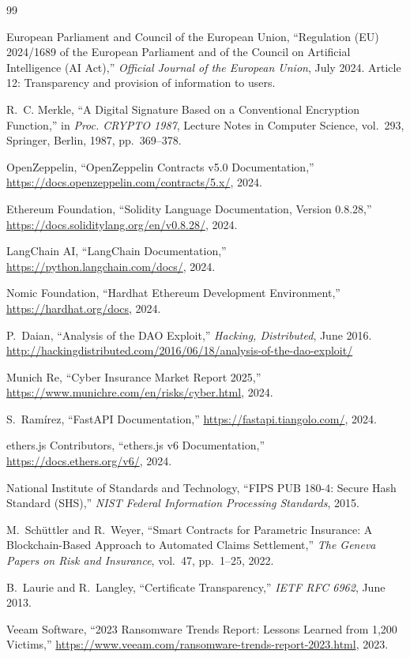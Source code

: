 \documentclass[12pt,a4paper]{article}
\begin{document}
\begin{thebibliography}{99}

European Parliament and Council of the European Union,
``Regulation (EU) 2024/1689 of the European Parliament and of the
Council on Artificial Intelligence (AI Act),''
\emph{Official Journal of the European Union}, July 2024.
Article 12: Transparency and provision of information to users.

R.~C. Merkle,
``A Digital Signature Based on a Conventional Encryption Function,''
in \emph{Proc. CRYPTO 1987}, Lecture Notes in Computer Science,
vol.~293, Springer, Berlin, 1987, pp.~369--378.

OpenZeppelin,
``OpenZeppelin Contracts v5.0 Documentation,''
\url{https://docs.openzeppelin.com/contracts/5.x/}, 2024.

Ethereum Foundation,
``Solidity Language Documentation, Version 0.8.28,''
\url{https://docs.soliditylang.org/en/v0.8.28/}, 2024.

LangChain AI,
``LangChain Documentation,''
\url{https://python.langchain.com/docs/}, 2024.

Nomic Foundation,
``Hardhat Ethereum Development Environment,''
\url{https://hardhat.org/docs}, 2024.

P.~Daian,
``Analysis of the DAO Exploit,''
\emph{Hacking, Distributed}, June 2016.
\url{http://hackingdistributed.com/2016/06/18/analysis-of-the-dao-exploit/}

Munich Re,
``Cyber Insurance Market Report 2025,''
\url{https://www.munichre.com/en/risks/cyber.html}, 2024.

S.~Ram\'irez,
``FastAPI Documentation,''
\url{https://fastapi.tiangolo.com/}, 2024.

ethers.js Contributors,
``ethers.js v6 Documentation,''
\url{https://docs.ethers.org/v6/}, 2024.

National Institute of Standards and Technology,
``FIPS PUB 180-4: Secure Hash Standard (SHS),''
\emph{NIST Federal Information Processing Standards}, 2015.

M.~Sch\"uttler and R.~Weyer,
``Smart Contracts for Parametric Insurance: A Blockchain-Based
Approach to Automated Claims Settlement,''
\emph{The Geneva Papers on Risk and Insurance}, vol.~47, pp.~1--25, 2022.

B.~Laurie and R.~Langley,
``Certificate Transparency,''
\emph{IETF RFC 6962}, June 2013.

Veeam Software,
``2023 Ransomware Trends Report: Lessons Learned from 1,200 Victims,''
\url{https://www.veeam.com/ransomware-trends-report-2023.html}, 2023.

\end{thebibliography}
\end{document}
